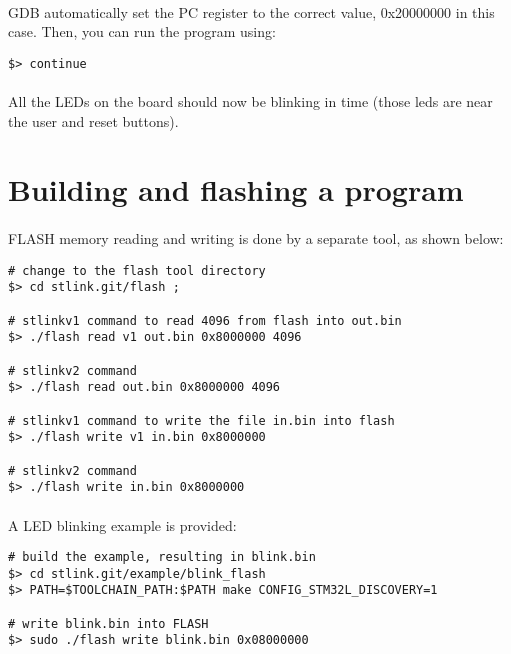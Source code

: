 \documentclass[a4paper, 11pt]{article}
\begin{document}
\paragraph{}
GDB automatically set the PC register to the correct value, 0x20000000 in this case. Then, you
can run the program using:\\
\begin{small}
\begin{lstlisting}[frame=tb]
$> continue
\end{lstlisting}
\end{small}

\paragraph{}
All the LEDs on the board should now be blinking in time (those leds are near the user and reset buttons).

\newpage
\section{Building and flashing a program}
\paragraph{}
FLASH memory reading and writing is done by a separate tool, as shown below:\\
\begin{small}
\begin{lstlisting}[frame=tb]
# change to the flash tool directory
$> cd stlink.git/flash ;

# stlinkv1 command to read 4096 from flash into out.bin
$> ./flash read v1 out.bin 0x8000000 4096

# stlinkv2 command
$> ./flash read out.bin 0x8000000 4096

# stlinkv1 command to write the file in.bin into flash
$> ./flash write v1 in.bin 0x8000000

# stlinkv2 command
$> ./flash write in.bin 0x8000000
\end{lstlisting}
\end{small}

\paragraph{}
A LED blinking example is provided:\\
\begin{small}
\begin{lstlisting}[frame=tb]
# build the example, resulting in blink.bin
$> cd stlink.git/example/blink_flash
$> PATH=$TOOLCHAIN_PATH:$PATH make CONFIG_STM32L_DISCOVERY=1

# write blink.bin into FLASH
$> sudo ./flash write blink.bin 0x08000000
\end{lstlisting}
\end{small}
\end{document}
